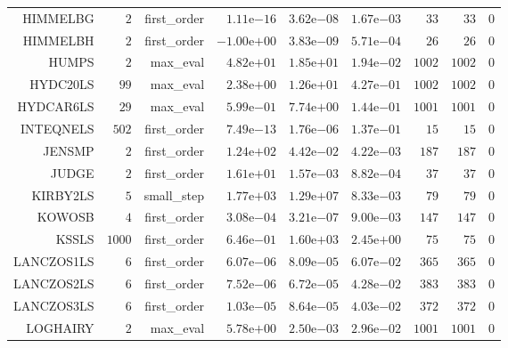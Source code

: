 \begin{longtable}{rrrrrrrrr}
HIMMELBG & \(     2\) & first\_order & \( 1.11\)e\(-16\) & \( 3.62\)e\(-08\) & \( 1.67\)e\(-03\) & \(    33\) & \(    33\) & \(     0\) \\
HIMMELBH & \(     2\) & first\_order & \(-1.00\)e\(+00\) & \( 3.83\)e\(-09\) & \( 5.71\)e\(-04\) & \(    26\) & \(    26\) & \(     0\) \\
HUMPS & \(     2\) & max\_eval & \( 4.82\)e\(+01\) & \( 1.85\)e\(+01\) & \( 1.94\)e\(-02\) & \(  1002\) & \(  1002\) & \(     0\) \\
HYDC20LS & \(    99\) & max\_eval & \( 2.38\)e\(+00\) & \( 1.26\)e\(+01\) & \( 4.27\)e\(-01\) & \(  1002\) & \(  1002\) & \(     0\) \\
HYDCAR6LS & \(    29\) & max\_eval & \( 5.99\)e\(-01\) & \( 7.74\)e\(+00\) & \( 1.44\)e\(-01\) & \(  1001\) & \(  1001\) & \(     0\) \\
INTEQNELS & \(   502\) & first\_order & \( 7.49\)e\(-13\) & \( 1.76\)e\(-06\) & \( 1.37\)e\(-01\) & \(    15\) & \(    15\) & \(     0\) \\
JENSMP & \(     2\) & first\_order & \( 1.24\)e\(+02\) & \( 4.42\)e\(-02\) & \( 4.22\)e\(-03\) & \(   187\) & \(   187\) & \(     0\) \\
JUDGE & \(     2\) & first\_order & \( 1.61\)e\(+01\) & \( 1.57\)e\(-03\) & \( 8.82\)e\(-04\) & \(    37\) & \(    37\) & \(     0\) \\
KIRBY2LS & \(     5\) & small\_step & \( 1.77\)e\(+03\) & \( 1.29\)e\(+07\) & \( 8.33\)e\(-03\) & \(    79\) & \(    79\) & \(     0\) \\
KOWOSB & \(     4\) & first\_order & \( 3.08\)e\(-04\) & \( 3.21\)e\(-07\) & \( 9.00\)e\(-03\) & \(   147\) & \(   147\) & \(     0\) \\
KSSLS & \(  1000\) & first\_order & \( 6.46\)e\(-01\) & \( 1.60\)e\(+03\) & \( 2.45\)e\(+00\) & \(    75\) & \(    75\) & \(     0\) \\
LANCZOS1LS & \(     6\) & first\_order & \( 6.07\)e\(-06\) & \( 8.09\)e\(-05\) & \( 6.07\)e\(-02\) & \(   365\) & \(   365\) & \(     0\) \\
LANCZOS2LS & \(     6\) & first\_order & \( 7.52\)e\(-06\) & \( 6.72\)e\(-05\) & \( 4.28\)e\(-02\) & \(   383\) & \(   383\) & \(     0\) \\
LANCZOS3LS & \(     6\) & first\_order & \( 1.03\)e\(-05\) & \( 8.64\)e\(-05\) & \( 4.03\)e\(-02\) & \(   372\) & \(   372\) & \(     0\) \\
LOGHAIRY & \(     2\) & max\_eval & \( 5.78\)e\(+00\) & \( 2.50\)e\(-03\) & \( 2.96\)e\(-02\) & \(  1001\) & \(  1001\) & \(     0\) \\

\end{longtable}
